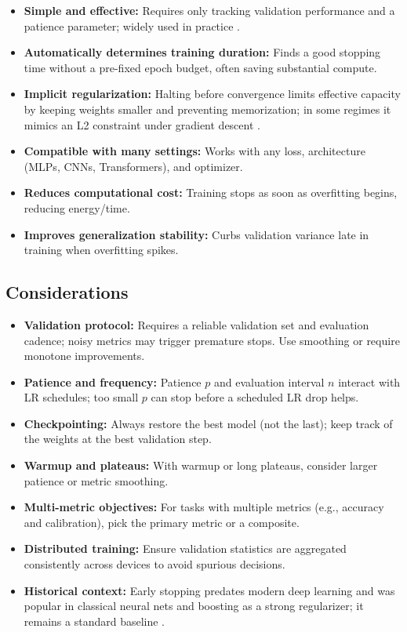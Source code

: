 \begin{itemize}
    \item \textbf{Simple and effective:} Requires only tracking validation performance and a patience parameter; widely used in practice \cite{GoodfellowEtAl2016,Prince2023}.
    \item \textbf{Automatically determines training duration:} Finds a good stopping time without a pre-fixed epoch budget, often saving substantial compute.
    \item \textbf{Implicit regularization:} Halting before convergence limits effective capacity by keeping weights smaller and preventing memorization; in some regimes it mimics an L2 constraint under gradient descent \cite{GoodfellowEtAl2016}.
    \item \textbf{Compatible with many settings:} Works with any loss, architecture (MLPs, CNNs, Transformers), and optimizer.
    \item \textbf{Reduces computational cost:} Training stops as soon as overfitting begins, reducing energy/time.
    \item \textbf{Improves generalization stability:} Curbs validation variance late in training when overfitting spikes.
\end{itemize}

\subsection{Considerations}

\begin{itemize}
    \item \textbf{Validation protocol:} Requires a reliable validation set and evaluation cadence; noisy metrics may trigger premature stops. Use smoothing or require monotone improvements.
    \item \textbf{Patience and frequency:} Patience $p$ and evaluation interval $n$ interact with LR schedules; too small $p$ can stop before a scheduled LR drop helps.
    \item \textbf{Checkpointing:} Always restore the best model (not the last); keep track of the weights at the best validation step.
    \item \textbf{Warmup and plateaus:} With warmup or long plateaus, consider larger patience or metric smoothing.
    \item \textbf{Multi-metric objectives:} For tasks with multiple metrics (e.g., accuracy and calibration), pick the primary metric or a composite.
    \item \textbf{Distributed training:} Ensure validation statistics are aggregated consistently across devices to avoid spurious decisions.
    \item \textbf{Historical context:} Early stopping predates modern deep learning and was popular in classical neural nets and boosting as a strong regularizer; it remains a standard baseline \cite{GoodfellowEtAl2016,Bishop2006}.
\end{itemize}

